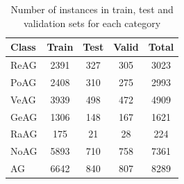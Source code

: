 \documentclass[11pt]{article}
\begin{document}
\begin{table}[h!]
\begin{center}
\small
\begin{tabular}{lcccc}
\hline
 \textbf{Class}  & \textbf{Train} & \textbf{Test} & \textbf{Valid} & \textbf{Total} \\
 \hline 
 ReAG  & 2391 & 327 & 305 & 3023 \\
 PoAG & 2408 & 310 & 275 & 2993\\
 VeAG & 3939 & 498 &  472 & 4909\\
 GeAG & 1306 & 148 &  167 & 1621\\
 RaAG & 175 & 21 &  28 & 224\\
 \hline
 NoAG & 5893 & 710 & 758 & 7361\\
 AG & 6642 & 840 & 807 & 8289\\
 \hline
\end{tabular}
\caption{Number of instances in train, test and validation sets for each category}
\label{dataset-split}
\end{center}
\end{table}



\end{document}
